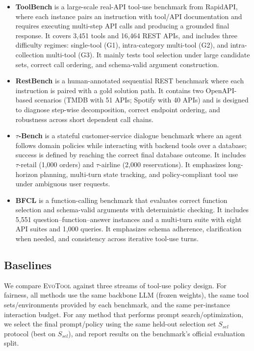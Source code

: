 \documentclass[11pt]{article}
\begin{document}
\begin{itemize}
  \item \textbf{ToolBench} \cite{qin2023toolllm} is a large-scale real-API tool-use benchmark from RapidAPI, where each instance pairs an instruction with tool/API documentation and requires executing multi-step API calls and producing a grounded final response. It covers 3,451 tools and 16,464 REST APIs, and includes three difficulty regimes: single-tool (G1), intra-category multi-tool (G2), and intra-collection multi-tool (G3). It mainly tests tool selection under large candidate sets, correct call ordering, and schema-valid argument construction.

  \item \textbf{RestBench} \cite{song2023restgpt} is a human-annotated sequential REST benchmark where each instruction is paired with a gold solution path. It contains two OpenAPI-based scenarios (TMDB with 51 APIs; Spotify with 40 APIs) and is designed to diagnose step-wise decomposition, correct endpoint ordering, and robustness across short dependent call chains.

  \item \textbf{$\tau$-Bench} \cite{yao2024tau} is a stateful customer-service dialogue benchmark where an agent follows domain policies while interacting with backend tools over a database; success is defined by reaching the correct final database outcome. It includes $\tau$-retail (1,000 orders) and $\tau$-airline (2,000 reservations). It emphasizes long-horizon planning, multi-turn state tracking, and policy-compliant tool use under ambiguous user requests.

  \item \textbf{BFCL} \cite{patil2025bfcl} is a function-calling benchmark that evaluates correct function selection and schema-valid arguments with deterministic checking. It includes 5,551 question--function--answer instances and a multi-turn suite with eight API suites and 1,000 queries. It emphasizes schema adherence, clarification when needed, and consistency across iterative tool-use turns.
\end{itemize}


\subsection{Baselines}
\label{app:baselines}

We compare \textsc{EvoTool} against three streams of tool-use policy design. For fairness, all methods use the same backbone LLM (frozen weights), the same tool sets/environments provided by each benchmark, and the same per-instance interaction budget. For any method that performs prompt search/optimization, we select the final prompt/policy using the same held-out selection set $S_{sel}$ protocol (best on $S_{sel}$), and report results on the benchmark’s official evaluation split.
\end{document}
